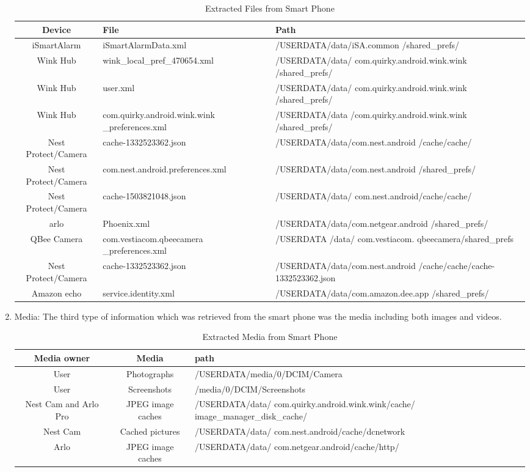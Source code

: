 \documentclass{easychair}
\begin{document}
\begin{enumerate}
\begin{table}[h]
\begin{tabular}{|c|m{5cm}|m{6.3cm}|}
\hline
Device & File & Path\\
\hline
iSmartAlarm & iSmartAlarmData.xml & 	/USERDATA/data/iSA.common
/shared\_prefs/\\
\hline
Wink Hub & wink\_local\_pref\_470654.xml & 	/USERDATA/data/
com.quirky.android.wink.wink
/shared\_prefs/\\
\hline
Wink Hub & user.xml & /USERDATA/data/
com.quirky.android.wink.wink
/shared\_prefs/\\
\hline
Wink Hub & com.quirky.android.wink.wink
\_preferences.xml	& /USERDATA/data
/com.quirky.android.wink.wink
/shared\_prefs/\\
\hline
Nest Protect/Camera	& cache-1332523362.json & /USERDATA/data/com.nest.android
/cache/cache/\\
\hline
Nest Protect/Camera	& com.nest.android.preferences.xml & /USERDATA/data/com.nest.android
/shared\_prefs/\\
\hline
Nest Protect/Camera	& cache-1503821048.json & /USERDATA/data/
com.nest.android/cache/cache/\\
\hline
arlo & Phoenix.xml & /USERDATA/data/com.netgear.android
/shared\_prefs/\\
\hline
QBee Camera & com.vestiacom.qbeecamera
\_preferences.xml & /USERDATA /data/
com.vestiacom. qbeecamera/shared\_prefs\\
\hline
Nest Protect/Camera	& cache-1332523362.json & /USERDATA/data/com.nest.android
/cache/cache/cache-1332523362.json\\
\hline
Amazon echo & service.identity.xml & /USERDATA/data/com.amazon.dee.app
/shared\_prefs/\\
\hline

\end{tabular}
 \caption{Extracted Files from Smart Phone}
   \label{tab:my_label}
\end{table}

\item Media:
The third type of information which was retrieved from the smart phone was the media including both images and videos.\\
\begin{table}[]
\begin{tabular}{|c|c|m{6.3cm}|}							 
\hline
Media owner & Media & path\\
\hline
User & Photographs & /USERDATA/media/0/DCIM/Camera\\
\hline
User & Screenshots & /media/0/DCIM/Screenshots\\
\hline
Nest Cam and Arlo Pro	& JPEG image caches	& /USERDATA/data/
com.quirky.android.wink.wink/cache/
image\_manager\_disk\_cache/\\
\hline
Nest Cam & Cached pictures & /USERDATA/data/
com.nest.android/cache/dcnetwork\\
\hline
Arlo & JPEG image caches & /USERDATA/data/
com.netgear.android/cache/http/\\
\hline
\end{tabular}
 \caption{Extracted Media from Smart Phone}
   \label{tab:my_label}
\end{table}
\end{enumerate}
\end{document}
